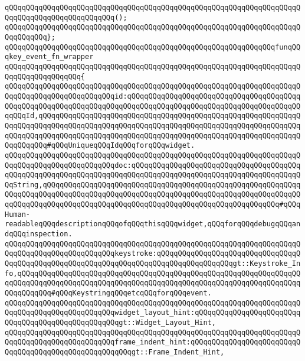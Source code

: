 \newline
\verb|qQQqqQQqqQQqqQQqqQQqqQQqqQQqqQQqqQQqqQQqqQQqqQQqqQQqqQQqqQQqqQQqqQQqqQQqqQQqqQQqqQQqqQQqqQQqqQQq();|\newline
\verb|qQQqqQQqqQQqqQQqqQQqqQQqqQQqqQQqqQQqqQQqqQQqqQQqqQQqqQQqqQQqqQQqqQQqqQQqqQQqqQQq};|\newline
\newline
\verb|qQQqqQQqqQQqqQQqqQQqqQQqqQQqqQQqqQQqqQQqqQQqqQQqqQQqqQQqqQQqqQQqfunqQQqkey_event_fn_wrapper|\newline
\verb|qQQqqQQqqQQqqQQqqQQqqQQqqQQqqQQqqQQqqQQqqQQqqQQqqQQqqQQqqQQqqQQqqQQqqQQqqQQqqQQqqQQqqQQq{|\newline
\verb|qQQqqQQqqQQqqQQqqQQqqQQqqQQqqQQqqQQqqQQqqQQqqQQqqQQqqQQqqQQqqQQqqQQqqQQqqQQqqQQqqQQqqQQqqQQqqQQqid:qQQqqQQqqQQqqQQqqQQqqQQqqQQqqQQqqQQqqQQqqQQqqQQqqQQqqQQqqQQqqQQqqQQqqQQqqQQqqQQqqQQqqQQqqQQqqQQqqQQqqQQqqQQqqQQqqQQqId,qQQqqQQqqQQqqQQqqQQqqQQqqQQqqQQqqQQqqQQqqQQqqQQqqQQqqQQqqQQqqQQqqQQqqQQqqQQqqQQqqQQqqQQqqQQqqQQqqQQqqQQqqQQqqQQqqQQqqQQqqQQqqQQqqQQqqQQqqQQqqQQqqQQqqQQqqQQqqQQqqQQqqQQqqQQqqQQqqQQqqQQqqQQqqQQqqQQqqQQqqQQqqQQqqQQq#qQQqUniqueqQQqIdqQQqforqQQqwidget.|\newline
\verb|qQQqqQQqqQQqqQQqqQQqqQQqqQQqqQQqqQQqqQQqqQQqqQQqqQQqqQQqqQQqqQQqqQQqqQQqqQQqqQQqqQQqqQQqqQQqqQQqdoc:qQQqqQQqqQQqqQQqqQQqqQQqqQQqqQQqqQQqqQQqqQQqqQQqqQQqqQQqqQQqqQQqqQQqqQQqqQQqqQQqqQQqqQQqqQQqqQQqqQQqqQQqqQQqqQQqString,qQQqqQQqqQQqqQQqqQQqqQQqqQQqqQQqqQQqqQQqqQQqqQQqqQQqqQQqqQQqqQQqqQQqqQQqqQQqqQQqqQQqqQQqqQQqqQQqqQQqqQQqqQQqqQQqqQQqqQQqqQQqqQQqqQQqqQQqqQQqqQQqqQQqqQQqqQQqqQQqqQQqqQQqqQQqqQQqqQQqqQQqqQQqqQQqqQQq#qQQqHuman-readableqQQqdescriptionqQQqofqQQqthisqQQqwidget,qQQqforqQQqdebugqQQqandqQQqinspection.|\newline
\verb|qQQqqQQqqQQqqQQqqQQqqQQqqQQqqQQqqQQqqQQqqQQqqQQqqQQqqQQqqQQqqQQqqQQqqQQqqQQqqQQqqQQqqQQqqQQqqQQqkeystroke:qQQqqQQqqQQqqQQqqQQqqQQqqQQqqQQqqQQqqQQqqQQqqQQqqQQqqQQqqQQqqQQqqQQqqQQqqQQqqQQqqQQqqQQqgt::Keystroke_Info,qQQqqQQqqQQqqQQqqQQqqQQqqQQqqQQqqQQqqQQqqQQqqQQqqQQqqQQqqQQqqQQqqQQqqQQqqQQqqQQqqQQqqQQqqQQqqQQqqQQqqQQqqQQqqQQqqQQqqQQqqQQqqQQqqQQqqQQqqQQqqQQqqQQq#qQQqKeystringqQQqetcqQQqforqQQqevent.|\newline
\verb|qQQqqQQqqQQqqQQqqQQqqQQqqQQqqQQqqQQqqQQqqQQqqQQqqQQqqQQqqQQqqQQqqQQqqQQqqQQqqQQqqQQqqQQqqQQqqQQqwidget_layout_hint:qQQqqQQqqQQqqQQqqQQqqQQqqQQqqQQqqQQqqQQqqQQqqQQqqQQqgt::Widget_Layout_Hint,|\newline
\verb|qQQqqQQqqQQqqQQqqQQqqQQqqQQqqQQqqQQqqQQqqQQqqQQqqQQqqQQqqQQqqQQqqQQqqQQqqQQqqQQqqQQqqQQqqQQqqQQqframe_indent_hint:qQQqqQQqqQQqqQQqqQQqqQQqqQQqqQQqqQQqqQQqqQQqqQQqqQQqqQQqgt::Frame_Indent_Hint,|\newline
